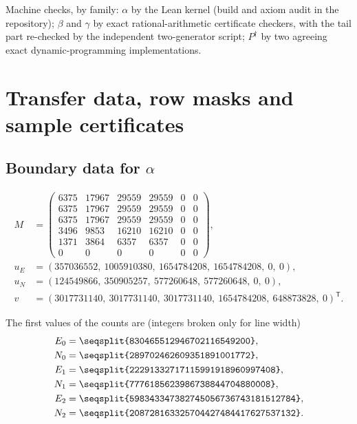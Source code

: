 \documentclass[11pt]{amsart}
\theoremstyle{definition}
\theoremstyle{remark}
\begin{document}
Machine checks, by family: $\alpha$ by the Lean kernel (build and axiom audit in the repository); $\beta$ and $\gamma$ by exact rational-arithmetic certificate checkers, with the tail part re-checked by the independent two-generator script; $P^\dagger$ by two agreeing exact dynamic-programming implementations.

\appendix
\section{Transfer data, row masks and sample certificates}\label{app:data}

\subsection*{Boundary data for $\alpha$}
\[
\begin{aligned}
M&=\begin{pmatrix}
6375&17967&29559&29559&0&0\\
6375&17967&29559&29559&0&0\\
6375&17967&29559&29559&0&0\\
3496&9853&16210&16210&0&0\\
1371&3864&6357&6357&0&0\\
0&0&0&0&0&0
\end{pmatrix},\\
u_E&=(357036552,\ 1005910380,\ 1654784208,\ 1654784208,\ 0,\ 0),\\
u_N&=(124549866,\ 350905257,\ 577260648,\ 577260648,\ 0,\ 0),\\
v&=(3017731140,\ 3017731140,\ 3017731140,\ 1654784208,\ 648873828,\ 0)^{\mathsf T}.
\end{aligned}
\]

The first values of the counts are (integers broken only for line width)
\begin{align*}
E_0&=\texttt{\seqsplit{830465512946702116549200}},\\
N_0&=\texttt{\seqsplit{289702462609351891001772}},\\
E_1&=\texttt{\seqsplit{22291332717115991918960997408}},\\
N_1&=\texttt{\seqsplit{7776185623986738844704880008}},\\
E_2&=\texttt{\seqsplit{598343347382745056736743181512784}},\\
N_2&=\texttt{\seqsplit{208728163325704427484417627537132}}.
\end{align*}
\end{document}
